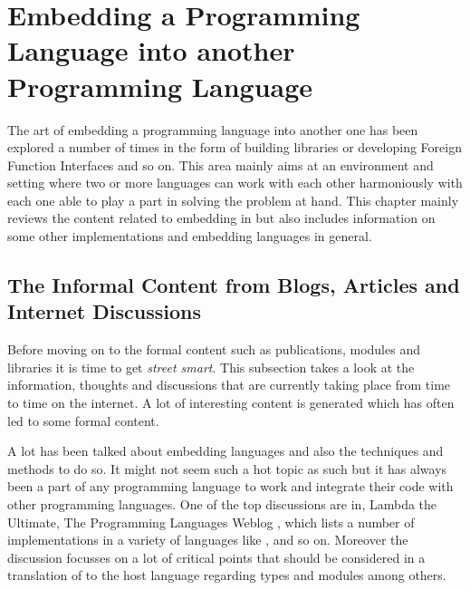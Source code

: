 \documentclass[proposal.tex]{subfiles}
\begin{document}
\chapter{Embedding a Programming Language into another Programming Language }\label{chap:embedding}

The art of embedding a programming language into another one has been explored a number of times in the form 
of building libraries or developing Foreign Function Interfaces and so on. This area mainly aims at an environment 
and setting where two or more languages can work with each other harmoniously with each one able to play a part 
in solving the problem at hand. This chapter mainly reviews the content related to embedding  in 
 but also includes information on some other implementations and embedding languages in 
general.          

\section{The Informal Content from Blogs, Articles and Internet Discussions}

Before moving on to the formal content such as publications, modules and libraries it is time to get \textit{street 
smart}. This subsection takes a look at the information, thoughts and discussions that are currently taking place 
from time to time on the internet. A lot of interesting content is generated which has often led to some formal 
content.   

\par A lot has been talked about embedding languages and also the techniques and methods to do so. It might not 
seem such a hot topic as such but it has always been a part of any programming language to work and integrate 
their code with other programming languages. One of the top discussions are in, Lambda the Ultimate, The 
Programming Languages Weblog \cite{website:lambda-the-ultimate},  which lists a number of  
implementations in a variety of languages like , 
 \cite{racklog} and so on. Moreover the discussion focusses on a lot of critical points that should 
be considered in a translation of  to the host language regarding types and modules among 
others. 
\end{document}
